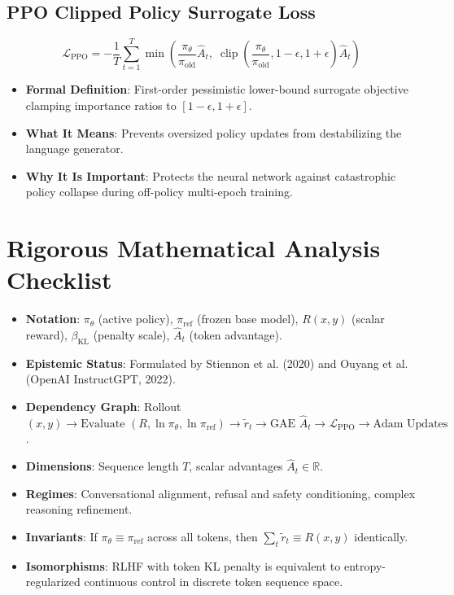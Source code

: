 \documentclass[11pt,a4paper]{article}
\theoremstyle{definition}
\begin{document}
\subsection{PPO Clipped Policy Surrogate Loss}
{\boldmath
\begin{equation}
\mathcal{L}_{\text{PPO}} = -\frac{1}{T}\sum_{t=1}^T \min\left( \frac{\pi_\theta}{\pi_{\text{old}}} \hat{A}_t, \; \operatorname{clip}\left(\frac{\pi_\theta}{\pi_{\text{old}}}, 1 - \epsilon, 1 + \epsilon\right) \hat{A}_t \right)
\end{equation}
}
\begin{itemize}
    \item \textbf{Formal Definition}: First-order pessimistic lower-bound surrogate objective clamping importance ratios to $[1 - \epsilon, 1 + \epsilon]$.
    \item \textbf{What It Means}: Prevents oversized policy updates from destabilizing the language generator.
    \item \textbf{Why It Is Important}: Protects the neural network against catastrophic policy collapse during off-policy multi-epoch training.
\end{itemize}

\section{Rigorous Mathematical Analysis Checklist}

\begin{itemize}
    \item \textbf{Notation}: $\pi_\theta$ (active policy), $\pi_{\text{ref}}$ (frozen base model), $R(x, y)$ (scalar reward), $\beta_{\text{KL}}$ (penalty scale), $\hat{A}_t$ (token advantage).
    \item \textbf{Epistemic Status}: Formulated by Stiennon et al. (2020) and Ouyang et al. (OpenAI InstructGPT, 2022).
    \item \textbf{Dependency Graph}: Rollout $(x, y) \to \text{Evaluate } (R, \ln \pi_\theta, \ln \pi_{\text{ref}}) \to \tilde{r}_t \to \text{GAE } \hat{A}_t \to \mathcal{L}_{\text{PPO}} \to \text{Adam Updates}$.
    \item \textbf{Dimensions}: Sequence length $T$, scalar advantages $\hat{A}_t \in \mathbb{R}$.
    \item \textbf{Regimes}: Conversational alignment, refusal and safety conditioning, complex reasoning refinement.
    \item \textbf{Invariants}: If $\pi_\theta \equiv \pi_{\text{ref}}$ across all tokens, then $\sum_t \tilde{r}_t \equiv R(x, y)$ identically.
    \item \textbf{Isomorphisms}: RLHF with token KL penalty is equivalent to entropy-regularized continuous control in discrete token sequence space.
\end{itemize}
\end{document}
